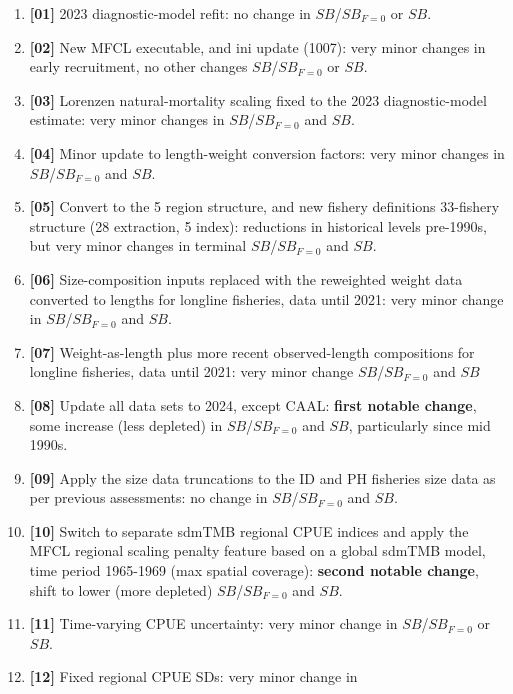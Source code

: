 \documentclass[
  english,
  a4paper,
  a4paper,
  11pt]{SCreport}
\begin{document}
\begin{enumerate}
\def\labelenumi{\arabic{enumi}.}
\item
  \textbf{{[}01{]}} 2023 diagnostic-model refit: no change in
  \(SB\)/\(SB_{F=0}\) or \(SB\).
\item
  \textbf{{[}02{]}} New MFCL executable, and ini update (1007): very
  minor changes in early recruitment, no other changes
  \(SB\)/\(SB_{F=0}\) or \(SB\).
\item
  \textbf{{[}03{]}} Lorenzen natural-mortality scaling fixed to the 2023
  diagnostic-model estimate: very minor changes in \(SB\)/\(SB_{F=0}\)
  and \(SB\).
\item
  \textbf{{[}04{]}} Minor update to length-weight conversion factors:
  very minor changes in \(SB\)/\(SB_{F=0}\) and \(SB\).
\item
  \textbf{{[}05{]}} Convert to the 5 region structure, and new fishery
  definitions 33-fishery structure (28 extraction, 5 index): reductions
  in historical levels pre-1990s, but very minor changes in terminal
  \(SB\)/\(SB_{F=0}\) and \(SB\).
\item
  \textbf{{[}06{]}} Size-composition inputs replaced with the reweighted
  weight data converted to lengths for longline fisheries, data until
  2021: very minor change in \(SB\)/\(SB_{F=0}\) and \(SB\).
\item
  \textbf{{[}07{]}} Weight-as-length plus more recent observed-length
  compositions for longline fisheries, data until 2021: very minor
  change \(SB\)/\(SB_{F=0}\) and \(SB\)
\item
  \textbf{{[}08{]}} Update all data sets to 2024, except CAAL:
  \textbf{first notable change}, some increase (less depleted) in
  \(SB\)/\(SB_{F=0}\) and \(SB\), particularly since mid 1990s.
\item
  \textbf{{[}09{]}} Apply the size data truncations to the ID and PH
  fisheries size data as per previous assessments: no change in
  \(SB\)/\(SB_{F=0}\) and \(SB\).
\item
  \textbf{{[}10{]}} Switch to separate sdmTMB regional CPUE indices and
  apply the MFCL regional scaling penalty feature based on a global
  sdmTMB model, time period 1965-1969 (max spatial coverage):
  \textbf{second notable change}, shift to lower (more depleted)
  \(SB\)/\(SB_{F=0}\) and \(SB\).
\item
  \textbf{{[}11{]}} Time-varying CPUE uncertainty: very minor change in
  \(SB\)/\(SB_{F=0}\) or \(SB\).
\item
  \textbf{{[}12{]}} Fixed regional CPUE SDs: very minor change in

\end{enumerate}
\end{document}
